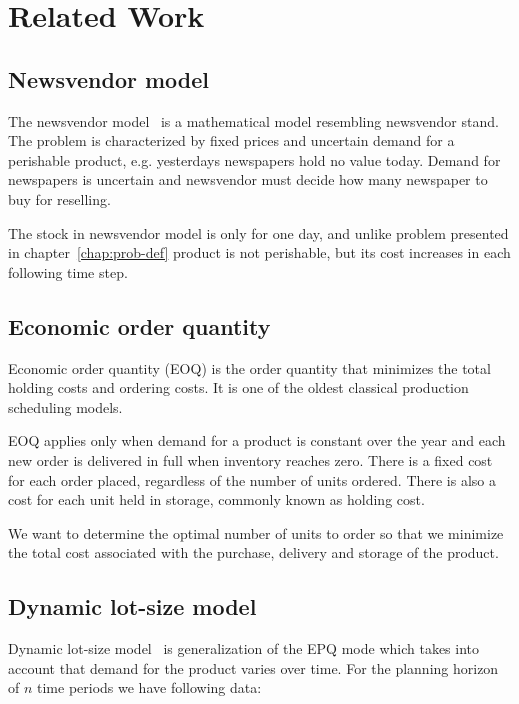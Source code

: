 
\chapter{Related Work}
\label{chap:Related Work}

\section{Newsvendor model}
\label{sec:Newsvendor model}

The newsvendor model~\autocite{Arrow1974} is a mathematical model resembling newsvendor stand. The problem is characterized by fixed prices and uncertain demand for a perishable product, e.g. yesterdays newspapers hold no value today. Demand for newspapers is uncertain and newsvendor must decide how many newspaper to buy for reselling.


The stock in newsvendor model is only for one day, and unlike problem presented in chapter~\ref{chap:prob-def} product is not perishable, but its cost increases in each following time step.

\section{Economic order quantity}
\label{sec:EOQ}

Economic order quantity (EOQ) is the order quantity that minimizes the total holding costs and ordering costs. It is one of the oldest classical production scheduling models.~\autocite{Harris1990}

EOQ applies only when demand for a product is constant over the year and each new order is delivered in full when inventory reaches zero. There is a fixed cost for each order placed, regardless of the number of units ordered. There is also a cost for each unit held in storage, commonly known as holding cost.

We want to determine the optimal number of units to order so that we minimize the total cost associated with the purchase, delivery and storage of the product.


\section{Dynamic lot-size model}
\label{sec:Dynamic lot-size model}

Dynamic lot-size model~\autocite{Wagner2004} is generalization of the EPQ mode
which takes into account that demand for the product varies over time. For the planning horizon of $n$ time periods we have following data:

